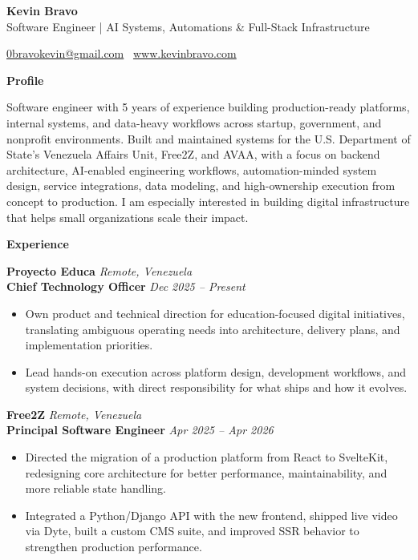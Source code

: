 \documentclass[11pt]{article}
\begin{document}
\begin{center}
    {\LARGE \textbf{Kevin Bravo}}\\
    Software Engineer | AI Systems, Automations \& Full-Stack Infrastructure \\
    \hrulefill
\end{center}
\begin{center}
    \href{mailto:0bravokevin@gmail.com}{0bravokevin@gmail.com}
    \textbullet\ 
    \href{http://www.kevinbravo.com}{www.kevinbravo.com}
\end{center}
\vspace{4pt}
\begin{center}
    \textbf{Profile}
\end{center}
\vspace{-4pt}
Software engineer with 5 years of experience building production-ready platforms, internal systems, and data-heavy workflows across startup, government, and nonprofit environments. Built and maintained systems for the U.S. Department of State's Venezuela Affairs Unit, Free2Z, and AVAA, with a focus on backend architecture, AI-enabled engineering workflows, automation-minded system design, service integrations, data modeling, and high-ownership execution from concept to production. I am especially interested in building digital infrastructure that helps small organizations scale their impact.
\vspace{8pt}
\begin{center}
    \textbf{Experience}
\end{center}
\vspace{-4pt}
\textbf{Proyecto Educa} \hfill \textit{Remote, Venezuela} \\
\textbf{Chief Technology Officer} \hfill \textit{Dec 2025 -- Present}
\begin{itemize}
    \item Own product and technical direction for education-focused digital initiatives, translating ambiguous operating needs into architecture, delivery plans, and implementation priorities.
    \item Lead hands-on execution across platform design, development workflows, and system decisions, with direct responsibility for what ships and how it evolves.
\end{itemize}
\vspace{10pt}
\textbf{Free2Z} \hfill \textit{Remote, Venezuela} \\
\textbf{Principal Software Engineer} \hfill \textit{Apr 2025 -- Apr 2026}
\begin{itemize}
    \item Directed the migration of a production platform from React to SvelteKit, redesigning core architecture for better performance, maintainability, and more reliable state handling.
    \item Integrated a Python/Django API with the new frontend, shipped live video via Dyte, built a custom CMS suite, and improved SSR behavior to strengthen production performance.
\end{itemize}
\end{document}
